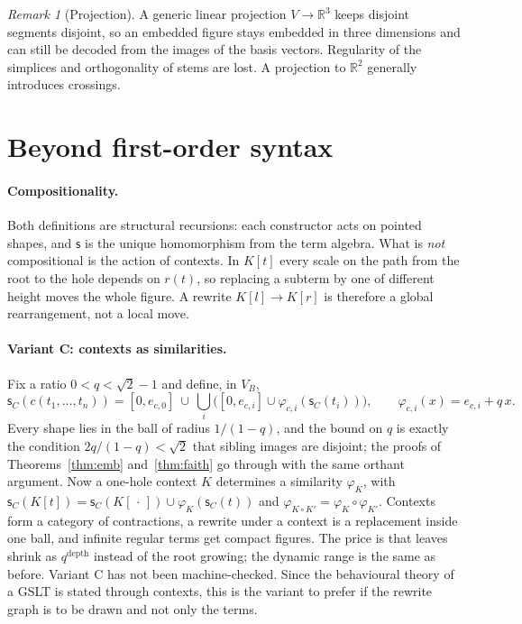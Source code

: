 \documentclass[11pt]{article}
\theoremstyle{definition}
\theoremstyle{remark}
\newtheorem{remark}[theorem]{Remark}
\newcommand{\R}{\mathbb{R}}
\newcommand{\sh}{\mathsf{s}}
\newcommand{\rad}{r}
\begin{document}
\begin{remark}[Projection]
A generic linear projection $V\to\R^3$ keeps disjoint segments disjoint, so an
embedded figure stays embedded in three dimensions and can still be decoded from
the images of the basis vectors. Regularity of the simplices and orthogonality of
stems are lost. A projection to $\R^2$ generally introduces crossings.
\end{remark}

\section{Beyond first-order syntax}\label{sec:beyond}

\paragraph{Compositionality.} Both definitions are structural recursions: each
constructor acts on pointed shapes, and $\sh$ is the unique homomorphism from the
term algebra. What is \emph{not} compositional is the action of contexts. In
$K[t]$ every scale on the path from the root to the hole depends on $\rad(t)$, so
replacing a subterm by one of different height moves the whole figure. A rewrite
$K[l]\to K[r]$ is therefore a global rearrangement, not a local move.

\paragraph{Variant C: contexts as similarities.} Fix a ratio
$0<q<\sqrt2-1$ and define, in $V_B$,
\[
\sh_C(c(t_1,\dots,t_n))=[0,e_{c,0}]\ \cup\ \bigcup_i\bigl([0,e_{c,i}]\cup\varphi_{c,i}(\sh_C(t_i))\bigr),
\qquad \varphi_{c,i}(x)=e_{c,i}+q\,x .
\]
Every shape lies in the ball of radius $1/(1-q)$, and the bound on $q$ is exactly
the condition $2q/(1-q)<\sqrt2$ that sibling images are disjoint; the proofs of
Theorems~\ref{thm:emb} and~\ref{thm:faith} go through with the same orthant
argument. Now a one-hole context $K$ determines a similarity $\varphi_K$, with
$\sh_C(K[t])=\sh_C(K[\,\cdot\,])\cup\varphi_K(\sh_C(t))$ and
$\varphi_{K\circ K'}=\varphi_K\circ\varphi_{K'}$. Contexts form a category of
contractions, a rewrite under a context is a replacement inside one ball, and
infinite regular terms get compact figures. The price is that leaves shrink as
$q^{\text{depth}}$ instead of the root growing; the dynamic range is the same as
before. Variant C has not been machine-checked. Since the behavioural theory of a
GSLT is stated through contexts, this is the variant to prefer if the rewrite
graph is to be drawn and not only the terms.
\end{document}
